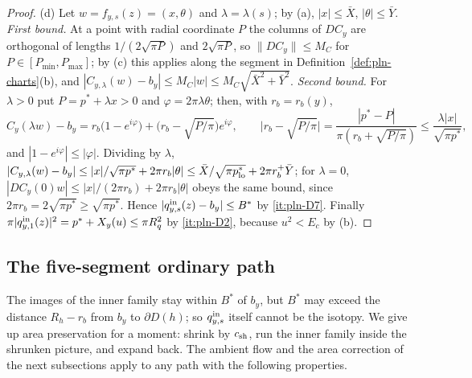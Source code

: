 \begin{proof}
(d) Let $w=f_{y,s}(z)=(x,\theta)$ and $\lambda=\lambda(s)$; by (a), $|x|\le\bar X$, $|\theta|\le\bar Y$. \emph{First bound.} At a
point with radial coordinate $P$ the columns of $DC_y$ are orthogonal of lengths $1/(2\sqrt{\pi P})$ and $2\sqrt{\pi P}$,
so $\|DC_y\|\le M_C$ for $P\in[P_{\min},P_{\max}]$; by (c) this applies along the segment in
Definition~\ref{def:pln-charts}(b), and $|C_{y,\lambda}(w)-b_y|\le M_C|w|\le M_C\sqrt{\bar X^2+\bar Y^2}$. \emph{Second bound.} For
$\lambda>0$ put $P=p^*+\lambda x>0$ and $\varphi=2\pi\lambda\theta$; then, with $r_b=r_b(y)$,
\[
 C_y(\lambda w)-b_y=r_b\bigl(1-e^{i\varphi}\bigr)+\bigl(r_b-\sqrt{P/\pi}\bigr)e^{i\varphi},\qquad
 \bigl|r_b-\sqrt{P/\pi}\bigr|=\frac{|p^*-P|}{\pi(r_b+\sqrt{P/\pi})}\le\frac{\lambda|x|}{\sqrt{\pi p^*}},
\]
and $|1-e^{i\varphi}|\le|\varphi|$. Dividing by $\lambda$, $|C_{y,\lambda}(w)-b_y|\le|x|/\sqrt{\pi p^*}+2\pi r_b|\theta|\le
\bar X/\sqrt{\pi p^*_{\rm lo}}+2\pi r_b^+\bar Y$; for $\lambda=0$, $|DC_y(0)w|\le|x|/(2\pi r_b)+2\pi r_b|\theta|$ obeys the same
bound, since $2\pi r_b=2\sqrt{\pi p^*}\ge\sqrt{\pi p^*}$. Hence $|q^{\rm in}_{y,s}(z)-b_y|\le B^*$ by \ref{it:pln-D7}. Finally
$\pi|q^{\rm in}_{y,1}(z)|^2=p^*+X_y(u)\le\pi R_q^2$ by \ref{it:pln-D2}, because $u^2<E_c$ by (b).
\end{proof}

\subsection{The five-segment ordinary path}\label{sec:pln-five}

The images of the inner family stay within $B^*$ of $b_y$, but $B^*$ may exceed the distance $R_h-r_b$ from $b_y$ to
$\partial D(h)$; so $q^{\rm in}_{y,s}$ itself cannot be the isotopy. We give up area preservation for a moment: shrink by
$c_{\rm sh}$, run the inner family inside the shrunken picture, and expand back. The ambient flow and the area correction
of the next subsections apply to any path with the following properties.

